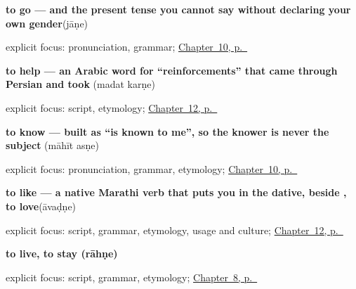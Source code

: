 \noindent\begin{minipage}[t]{\linewidth}
\raggedright
\textbf{to go — and the present tense you cannot say without declaring your own gender}\enspace\emph{}\enspace(jāṇe)\par
\footnotesize explicit focus: pronunciation, grammar; \hyperref[ch:mr-core-verbs]{Chapter~10, p.~\pageref*{ch:mr-core-verbs}}
\end{minipage}\par\smallskip

\noindent\begin{minipage}[t]{\linewidth}
\raggedright
\textbf{to help — an Arabic word for \textquotedblleft{}reinforcements\textquotedblright{} that came through Persian and took }\enspace\emph{ }\enspace(madat karṇe)\par
\footnotesize explicit focus: script, etymology; \hyperref[ch:mr-doing-verbs]{Chapter~12, p.~\pageref*{ch:mr-doing-verbs}}
\end{minipage}\par\smallskip

\noindent\begin{minipage}[t]{\linewidth}
\raggedright
\textbf{to know — built as \textquotedblleft{}is known to me\textquotedblright{}, so the knower is never the subject}\enspace\emph{ }\enspace(māhīt asṇe)\par
\footnotesize explicit focus: pronunciation, grammar, etymology; \hyperref[ch:mr-core-verbs]{Chapter~10, p.~\pageref*{ch:mr-core-verbs}}
\end{minipage}\par\smallskip

\noindent\begin{minipage}[t]{\linewidth}
\raggedright
\textbf{to like — a native Marathi verb that puts you in the dative, beside  , to love}\enspace\emph{}\enspace(āvaḍṇe)\par
\footnotesize explicit focus: script, grammar, etymology, usage and culture; \hyperref[ch:mr-doing-verbs]{Chapter~12, p.~\pageref*{ch:mr-doing-verbs}}
\end{minipage}\par\smallskip

\noindent\begin{minipage}[t]{\linewidth}
\raggedright
\textbf{to live, to stay (rāhṇe)}\enspace\emph{}\par
\footnotesize explicit focus: script, grammar, etymology; \hyperref[ch:first-verbs]{Chapter~8, p.~\pageref*{ch:first-verbs}}
\end{minipage}\par\smallskip

